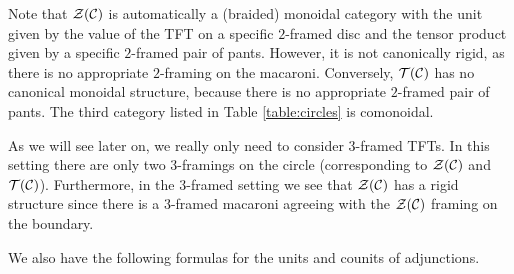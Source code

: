 \documentclass{amsart}
\begin{document}
\begin{remark}
Note that $\mathcal Z(\mathcal C)$ is automatically a (braided) monoidal category with the unit given by the value of the TFT on a specific $2$-framed disc and the tensor product given by a specific $2$-framed pair of pants.  However, it is not canonically rigid, as there is no appropriate $2$-framing on the macaroni.  Conversely, $\mathcal T(\mathcal C)$ has no canonical monoidal structure, because there is no appropriate $2$-framed pair of pants.  The third category listed in Table \ref{table:circles} is comonoidal.

As we will see later on, we really only need to consider $3$-framed TFTs.  In this setting there are only two $3$-framings on the circle (corresponding to $\mathcal Z(\mathcal C)$ and $\mathcal T(\mathcal C)$).  Furthermore, in the $3$-framed setting we see that $\mathcal Z(\mathcal C)$ has a rigid structure since there is a $3$-framed macaroni agreeing with the $\mathcal Z(\mathcal C)$ framing on the boundary.
\end{remark}

We also have the following formulas for the units and counits of adjunctions.
\end{document}
